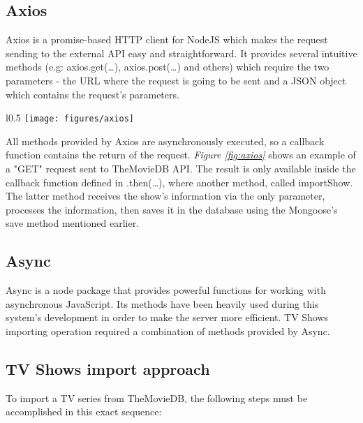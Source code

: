 \subsection{Axios}

Axios \cite{19} is a promise-based HTTP client for NodeJS which makes the request sending to the external API easy and straightforward. It provides several intuitive methods (e.g: axios.get(…), axios.post(…) and others) which require the two parameters - the URL where the request is going to be sent and a JSON object which contains the request's parameters.

\begin{wrapfigure}{l}{0.5\textwidth}
\centering
\texttt{[image: figures/axios]}
\caption{Axios GET request}
\vspace{-1em}
\label{fig:axios}
\end{wrapfigure}

All methods provided by Axios are asynchronously executed, so a callback function contains the return of the request. \textit{Figure \ref{fig:axios}} shows an example of a "GET" request sent to TheMovieDB API. The result is only available inside the callback function defined in .then(…), where another method, called importShow. The latter method receives the show's information via the only parameter, processes the information, then saves it in the database using the Mongoose's save method mentioned earlier.

\subsection{Async}

Async \cite{async} is a node package that provides powerful functions for working with asynchronous JavaScript. Its methods have been heavily used during this system's development in order to make the server more efficient. TV Shows importing operation required a combination of methods provided by Async.

\subsection{TV Shows import approach}

To import a TV series from TheMovieDB, the following steps must be accomplished in this exact sequence:

